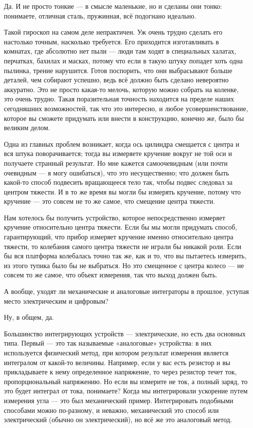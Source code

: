 \documentclass[11pt,oneside]{article}
\begin{document}
Да. И не просто тонкие --- в смысле маленькие, но и сделаны они тонко: понимаете, отличная сталь, пружинная, всё подогнано идеально.\par

Такой гироскоп на самом деле непрактичен. Уж очень трудно сделать его настолько точным, насколько требуется. Его приходится изготавливать в комнатах, где абсолютно нет пыли --- люди там ходят в специальных халатах, перчатках, бахилах и масках, потому что если в такую штуку попадет хоть одна пылинка, трение нарушится. Готов поспорить, что они выбрасывают больше деталей, чем собирают успешно, ведь всё должно быть сделано невероятно аккуратно. Это не просто какая-то мелочь, которую можно собрать на коленке, это очень трудно. Такая поразительная точность находится на пределе наших сегодняшних возможностей, так что это интересно, и любое усовершенствование, которое вы сможете придумать или внести в конструкцию, конечно же, было бы великим делом.\par

Одна из главных проблем возникает, когда ось цилиндра смещается с центра и вся штука поворачивается; тогда вы измеряете кручение вокруг не той оси и получаете странный результат. Но мне кажется самоочевидным (или почти очевидным --- я могу ошибаться), что это несущественно; что должен быть какой-то способ подвесить вращающееся тело так, чтобы подвес следовал за центром тяжести. И в то же время вы могли бы измерять кручение, потому что кручение --- это совсем не то же самое, что смещение центра тяжести.\par

Нам хотелось бы получить устройство, которое непосредственно измеряет кручение относительно центра тяжести. Если бы мы могли придумать способ, гарантирующий, что прибор измеряет кручение именно относительно центра тяжести, то колебания самого центра тяжести не играли бы никакой роли. Если бы вся платформа колебалась точно так же, как и то, что вы пытаетесь измерить, из этого тупика было бы не выбраться. Но это смещенное с центра колесо --- не совсем то же самое, что объект измерения, так что выход должен быть.\par

А вообще, уходят ли механические и аналоговые интеграторы в прошлое, уступая место электрическим и цифровым?\par

Ну, в общем, да.\par

Большинство интегрирующих устройств --- электрические, но есть два основных типа. Первый --- это так называемые «аналоговые» устройства: в них используется физический метод, при котором результат измерения является интегралом от какой-то величины. Например, если у вас есть резистор и вы прикладываете к нему определенное напряжение, то через резистор течет ток, пропорциональный напряжению. Но если вы измерите не ток, а полный заряд, то это будет интеграл от тока, понимаете? Когда мы интегрировали ускорение путем измерения угла --- это был механический пример. Интегрировать подобными способами можно по-разному, и неважно, механический это способ или электрический (обычно он электрический), но всё же это аналоговый метод.\par
\end{document}
